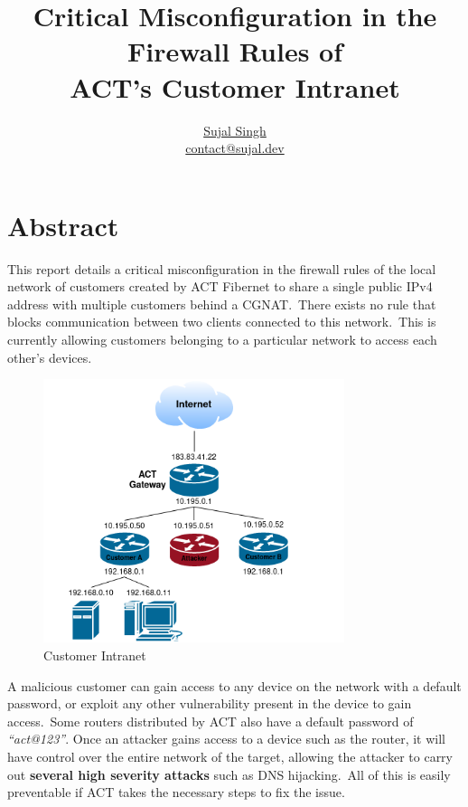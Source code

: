 \documentclass[11pt]{article}
\title{\textbf{Critical Misconfiguration in the Firewall Rules of \\ ACT's Customer Intranet}}
\author{\href{https://github.com/sujaldev}{Sujal Singh} \\ \href{mailto:contact@sujal.dev}{contact@sujal.dev}}
\date{}
\begin{document}
    \maketitle

    \section*{Abstract}
    This report details a critical misconfiguration in the firewall rules of the local network of customers created by
    ACT Fibernet to share a single public IPv4 address with multiple customers behind a CGNAT.\ There exists no rule
    that blocks communication between two clients connected to this network.\ This is currently allowing customers
    belonging to a particular network to access each other's devices.

    \begin{figure}[!htb]
        \centering
        \includegraphics[width=250pt]{./diagrams/network-hierarchy}
        \caption{Customer Intranet}
        \label{fig:1}
    \end{figure}

    A malicious customer can gain access to any device on the network with a default password, or exploit any other
    vulnerability present in the device to gain access.\ Some routers distributed by ACT also have a default password
    of \emph{``act@123''}{.} Once an attacker gains access to a device such as the router, it will have control over
    the entire network of the target, allowing the attacker to carry out \textbf{several high severity attacks} such as
    DNS hijacking.\ All of this is easily preventable if ACT takes the necessary steps to fix the issue.
\end{document}
